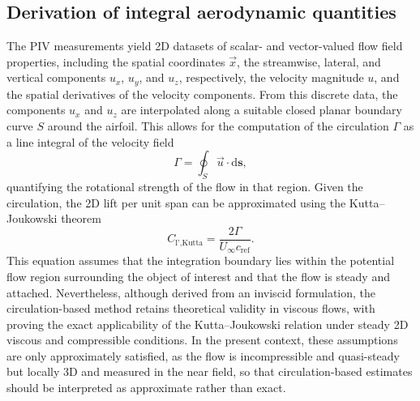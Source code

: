 \documentclass[wes, manuscript]{copernicus}
\begin{document}
\subsection{Derivation of integral aerodynamic quantities}\label{sec:integral_aerodynamic_quantities}
%
The PIV measurements yield 2D datasets of scalar- and vector-valued flow field properties, including the spatial coordinates $\vec{x}$, the streamwise, lateral, and vertical components $u_x$, $u_y$, and $u_z$, respectively, the velocity magnitude $u$, and the spatial derivatives of the velocity components. From this discrete data, the components $u_x$ and $u_z$ are interpolated along a suitable closed planar boundary curve $S$ around the airfoil.
This allows for the computation of the circulation $\Gamma$ as a line integral of the velocity field
\begin{equation}
    \Gamma = \oint_{S} \vec{u} \cdot \textrm{d}\mathbf{s} ,
\end{equation}
quantifying the rotational strength of the flow in that region.
Given the circulation, the 2D lift per unit span can be approximated using the Kutta--Joukowski theorem \citep{Anderson2016}
\begin{equation}
    C_{\textrm{l',Kutta}} = \frac{2\Gamma}{U_{\infty}c_{\textrm{ref}}} .
\end{equation}
This equation assumes that the integration boundary lies within the potential flow region surrounding the object of interest and that the flow is steady and attached. Nevertheless, although derived from an inviscid formulation, the circulation-based method retains theoretical validity in viscous flows, with \cite{Liu2015} proving the exact applicability of the Kutta–Joukowski relation under steady 2D viscous and compressible conditions. In the present context, these assumptions are only approximately satisfied, as the flow is incompressible and quasi-steady but locally 3D and measured in the near field, so that circulation-based estimates should be interpreted as approximate rather than exact.
\end{document}
